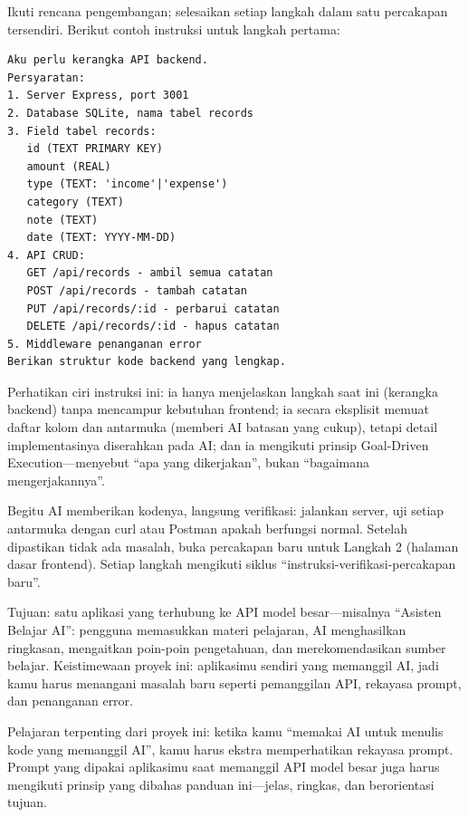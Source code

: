 
Ikuti rencana pengembangan; selesaikan setiap langkah dalam satu percakapan tersendiri. Berikut contoh instruksi untuk langkah pertama:

\begin{lstlisting}
Aku perlu kerangka API backend.
Persyaratan:
1. Server Express, port 3001
2. Database SQLite, nama tabel records
3. Field tabel records:
   id (TEXT PRIMARY KEY)
   amount (REAL)
   type (TEXT: 'income'|'expense')
   category (TEXT)
   note (TEXT)
   date (TEXT: YYYY-MM-DD)
4. API CRUD:
   GET /api/records - ambil semua catatan
   POST /api/records - tambah catatan
   PUT /api/records/:id - perbarui catatan
   DELETE /api/records/:id - hapus catatan
5. Middleware penanganan error
Berikan struktur kode backend yang lengkap.
\end{lstlisting}

Perhatikan ciri instruksi ini: ia hanya menjelaskan langkah saat ini (kerangka backend) tanpa mencampur kebutuhan frontend; ia secara eksplisit memuat daftar kolom dan antarmuka (memberi AI batasan yang cukup), tetapi detail implementasinya diserahkan pada AI; dan ia mengikuti prinsip Goal-Driven Execution—menyebut “apa yang dikerjakan”, bukan “bagaimana mengerjakannya”.

Begitu AI memberikan kodenya, langsung verifikasi: jalankan server, uji setiap antarmuka dengan curl atau Postman apakah berfungsi normal. Setelah dipastikan tidak ada masalah, buka percakapan baru untuk Langkah 2 (halaman dasar frontend). Setiap langkah mengikuti siklus “instruksi-verifikasi-percakapan baru”.



Tujuan: satu aplikasi yang terhubung ke API model besar—misalnya “Asisten Belajar AI”: pengguna memasukkan materi pelajaran, AI menghasilkan ringkasan, mengaitkan poin-poin pengetahuan, dan merekomendasikan sumber belajar. Keistimewaan proyek ini: aplikasimu sendiri yang memanggil AI, jadi kamu harus menangani masalah baru seperti pemanggilan API, rekayasa prompt, dan penanganan error.

Pelajaran terpenting dari proyek ini: ketika kamu “memakai AI untuk menulis kode yang memanggil AI”, kamu harus ekstra memperhatikan rekayasa prompt. Prompt yang dipakai aplikasimu saat memanggil API model besar juga harus mengikuti prinsip yang dibahas panduan ini—jelas, ringkas, dan berorientasi tujuan.

